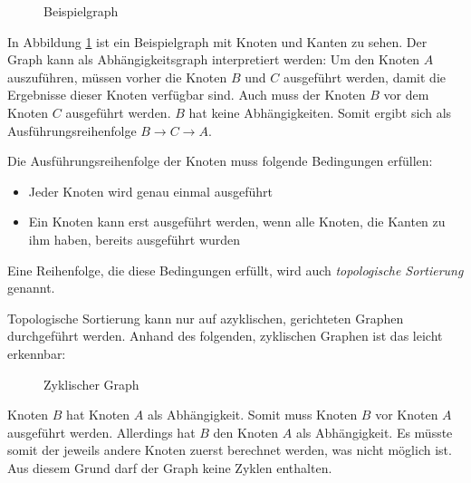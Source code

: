 \begin{figure}[H]
    \centering
    \caption{Beispielgraph}
    \label{fig:nodeExecutionOrder1}
\end{figure}

In Abbildung \ref{fig:nodeExecutionOrder1} ist ein Beispielgraph mit Knoten und Kanten zu sehen. Der Graph kann als Abhängigkeitsgraph interpretiert werden: Um den Knoten $A$ auszuführen, müssen vorher die Knoten $B$ und $C$ ausgeführt werden, damit die Ergebnisse dieser Knoten verfügbar sind. Auch muss der Knoten $B$ vor dem Knoten $C$ ausgeführt werden. $B$ hat keine Abhängigkeiten. Somit ergibt sich als Ausführungsreihenfolge $B \rightarrow C \rightarrow A$.

Die Ausführungsreihenfolge der Knoten muss folgende Bedingungen erfüllen:
\begin{itemize}
    \item Jeder Knoten wird genau einmal ausgeführt
    \item Ein Knoten kann erst ausgeführt werden, wenn alle Knoten, die Kanten zu ihm haben, bereits ausgeführt wurden
\end{itemize}

Eine Reihenfolge, die diese Bedingungen erfüllt, wird auch \textit{topologische Sortierung} genannt.

Topologische Sortierung kann nur auf azyklischen, gerichteten Graphen durchgeführt werden. Anhand des folgenden, zyklischen Graphen ist das leicht erkennbar:
\begin{figure}[H]
    \centering
    \caption{Zyklischer Graph}
    \label{fig:cyclicGraph}
\end{figure}
Knoten $B$ hat Knoten $A$ als Abhängigkeit. Somit muss Knoten $B$ vor Knoten $A$ ausgeführt werden. Allerdings hat $B$ den Knoten $A$ als Abhängigkeit. Es müsste somit der jeweils andere Knoten zuerst berechnet werden, was nicht möglich ist. Aus diesem Grund darf der Graph keine Zyklen enthalten.

